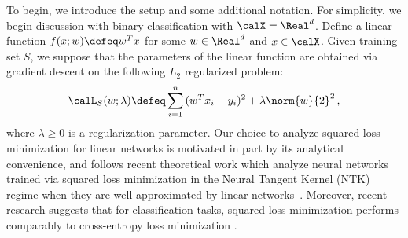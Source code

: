 To begin, we introduce the setup and some additional notation.
For simplicity, we begin discussion with binary classification with $\calX = \Real^d$. 
Define a linear function $f(x; w) \defeq w^T{x}$ 
for some $w \in \Real^d$ and $x\in \calX$. %
Given training set $S$,
we suppose that the parameters of the linear function 
are obtained via gradient descent on 
the following $L_2$ regularized problem: 
\begin{align}
    \calL_S(w; \lambda) \defeq \sum_{i=1}^n{(w^Tx_i - y_i)^2} + \lambda \norm{w}{2}^2 \,, \label{eq:l2_MSE}   
\end{align}
where $\lambda\ge0$ is a regularization parameter. 
% 
% 
% 
% 
Our choice to analyze squared loss minimization for linear networks 
is motivated in part by its analytical convenience, and follows
recent theoretical work which analyze 
neural networks trained via squared loss minimization
in the Neural Tangent Kernel (NTK) regime when 
they are well approximated by linear networks~\citep{jacot2018neural,arora2019fine,du2019gradient,hu2019simple}. 
Moreover, recent research suggests that for classification tasks,
squared loss minimization performs comparably to cross-entropy loss 
minimization
\citep{muthukumar2020classification,hui2020evaluation}. 
% 
% 
% 
%

